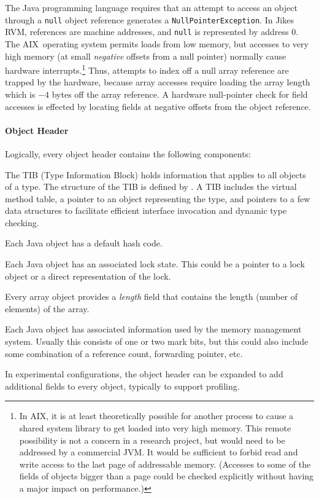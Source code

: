 The Java programming language requires that an attempt to access an
object through a {\tt null} 
object reference generates a {\tt NullPointerException}.  In Jikes RVM, references
are machine addresses, and {\tt null} is represented by address $0$.
The AIX\AIXTMFootnote\ operating system permits loads from low memory,
but accesses 
to very high memory (at small {\em negative} offsets from a null
pointer) normally cause hardware interrupts.\footnote{In AIX, it is at
least theoretically possible for another process to cause a shared
system library to get loaded into very high memory.  This remote
possibility is not a concern in a research project, but would need to
be addressed by a commercial JVM.  It would be sufficient to forbid
read and write access to the last page of addressable memory.
(Accesses to some of the fields of objects bigger than a page could be
checked explicitly without having a major impact on performance.)}
Thus, attempts to index off a null array reference are trapped by
the hardware, because array accesses require loading the array length
which is $-4$ bytes off the array reference.  A hardware null-pointer
check for field accesses is effected by locating fields at negative
offsets from the object reference.

\paragraph{Object Header}
Logically, every object header contains the following components:
\begin{description}
%
\item [TIB Pointer] The TIB (Type Information Block) holds information that
applies to all objects of a type.  The structure of the TIB is defined by 
.
A TIB includes the virtual method table, a pointer to an object
representing the type, and pointers to a few data structures to
facilitate efficient interface invocation and dynamic type checking.
%
\item[Default Hash Code] Each Java object has a default hash code.
%
\item[Lock] Each Java object has an associated lock state.  This could be a
pointer to a lock object or a direct representation of the lock.
%
\item[Array Length] Every array object provides a {\em length} field
that contains the length (number of elements) of the array.
%
\item[Garbage Collection Information] Each Java object has associated
information used by the memory management system.  Usually this consists of one
or two mark bits, but this could also include some combination of a reference
count, forwarding pointer, etc.
%
\item[Misc Fields] In experimental configurations, the object header
can be expanded to add additional fields to every object, typically to
support profiling. 
\end{description}

